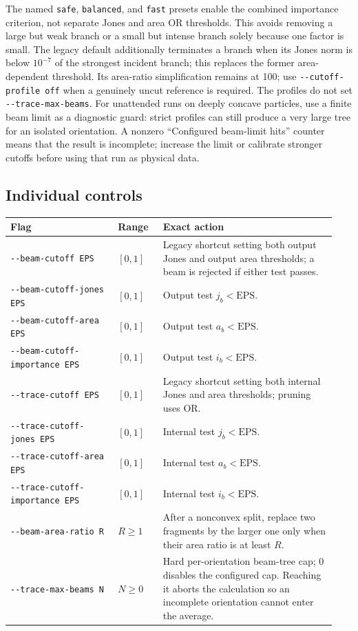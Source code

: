 \documentclass[
  10pt,
  a4paper,
]{article}
\begin{document}
The named \texttt{safe}, \texttt{balanced}, and \texttt{fast} presets enable the combined importance criterion, not separate
Jones and area OR thresholds. This avoids removing a large but weak branch or
a small but intense branch solely because one factor is small. The legacy
default additionally terminates a branch when its Jones norm is below
$10^{-7}$ of the strongest incident branch; this replaces the former
area-dependent threshold. Its area-ratio simplification remains at 100; use
\texttt{-\/-cutoff-profile off} when a genuinely uncut reference is required.
The profiles do not set \texttt{-\/-trace-max-beams}.  For unattended runs
on deeply concave particles, use a finite beam limit as a diagnostic guard:
strict profiles can still produce a very large tree for an isolated
orientation.  A nonzero ``Configured beam-limit hits'' counter means that the
result is incomplete; increase the limit or calibrate stronger cutoffs before
using that run as physical data.

\subsection{Individual controls}

\begin{longtable}[]{@{}L{0.31\linewidth}L{0.13\linewidth}L{0.50\linewidth}@{}}
\toprule\noalign{}
Flag & Range & Exact action \\
\midrule\noalign{}
\endhead
\bottomrule\noalign{}
\endlastfoot
\texttt{-\/-beam-cutoff EPS} & $[0,1]$ & Legacy shortcut setting both
output Jones and output area thresholds; a beam is rejected if either test
passes. \\
\texttt{-\/-beam-cutoff-jones EPS} & $[0,1]$ & Output test $j_b<\mathrm{EPS}$. \\
\texttt{-\/-beam-cutoff-area EPS} & $[0,1]$ & Output test $a_b<\mathrm{EPS}$. \\
\texttt{-\/-beam-cutoff-importance EPS} & $[0,1]$ & Output test
$i_b<\mathrm{EPS}$. \\
\texttt{-\/-trace-cutoff EPS} & $[0,1]$ & Legacy shortcut setting both
internal Jones and area thresholds; pruning uses OR. \\
\texttt{-\/-trace-cutoff-jones EPS} & $[0,1]$ & Internal test $j_b<\mathrm{EPS}$. \\
\texttt{-\/-trace-cutoff-area EPS} & $[0,1]$ & Internal test $a_b<\mathrm{EPS}$. \\
\texttt{-\/-trace-cutoff-importance EPS} & $[0,1]$ & Internal test
$i_b<\mathrm{EPS}$. \\
\texttt{-\/-beam-area-ratio R} & $R\ge1$ & After a nonconvex split,
replace two fragments by the larger one only when their area ratio is at
least $R$. \\
\texttt{-\/-trace-max-beams N} & $N\ge0$ & Hard per-orientation beam-tree
cap; 0 disables the configured cap. Reaching it aborts the calculation so an
incomplete orientation cannot enter the average. \\
\end{longtable}
\end{document}

